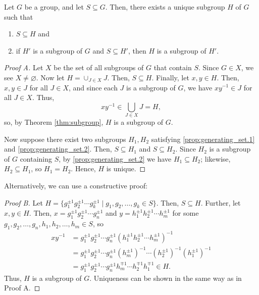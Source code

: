 \begin{prop}\label{prop:generating_set}
Let $ G $ be a group, and let $ S\subseteq G $. Then, there exists a unique subgroup $ H $ of $ G $ such that
\begin{enumerate}
    \item $ S\subseteq H $ and \label{prop:generating_set.1}
    \item if $ H' $ is a subgroup of $ G $ and $ S\subseteq H' $, then $ H $ is a subgroup of $ H' $. \label{prop:generating_set.2}
\end{enumerate}
\end{prop}
\begin{proof}[Proof A]
Let $ X $ be the set of all subgroups of $ G $ that contain $ S $. Since $ G\in X $, we see $ X\neq\varnothing $. Now let $ H=\cup_{J\in X}J $. Then, $ S\subseteq H $. Finally, let $ x,y\in H $. Then, $ x,y\in J $ for all $ J\in X $, and since each $ J $ is a subgroup of $ G $, we have $ xy^{-1}\in J $ for all $ J\in X $. Thus,
\begin{equation*}
    xy^{-1}\in\bigcup_{J\in X}J=H,
\end{equation*}
so, by Theorem \ref{thm:subgroup}, $ H $ is a subgroup of $ G $.

Now suppose there exist two subgroups $ H_1,H_2 $ satisfying \ref{prop:generating_set.1} and \ref{prop:generating_set.2}. Then, $ S\subseteq H_1 $ and $ S\subseteq H_2 $. Since $ H_2 $ is a subgroup of $ G $ containing $ S $, by \ref{prop:generating_set.2} we have $ H_1\subseteq H_2 $; likewise, $ H_2\subseteq H_1 $, so $ H_1=H_2 $. Hence, $ H $ is unique.
\end{proof}
Alternatively, we can use a constructive proof:
\begin{proof}[Proof B]
Let $ H=\{g_1^{\pm 1}g_2^{\pm 1}\cdots g_k^{\pm 1}\mid g_1,g_2,\ldots,g_k\in S\} $. Then, $ S\subseteq H $. Further, let $ x,y\in H $. Then, $ x=g_1^{\pm 1}g_2^{\pm 1}\cdots g_n^{\pm 1} $ and $ y=h_1^{\pm 1}h_2^{\pm 1}\cdots h_m^{\pm 1} $ for some $ g_1,g_2,\ldots,g_n,h_1,h_2,\ldots,h_m\in S $, so
\begin{align*}
    xy^{-1} &= g_1^{\pm 1}g_2^{\pm 1}\cdots g_n^{\pm 1}(h_1^{\pm 1}h_2^{\pm 1}\cdots h_m^{\pm 1})^{-1} \\
    &= g_1^{\pm 1}g_2^{\pm 1}\cdots g_n^{\pm 1}(h_m^{\pm 1})^{-1}\cdots(h_2^{\pm 1})^{-1}(h_1^{\pm 1})^{-1} \\
    &= g_1^{\pm 1}g_2^{\pm 1}\cdots g_n^{\pm 1}h_m^{\mp 1}\cdots h_2^{\mp 1}h_1^{\mp 1}\in H.
\end{align*}
Thus, $ H $ is a subgroup of $ G $. Uniqueness can be shown in the same way as in Proof A.
\end{proof}

